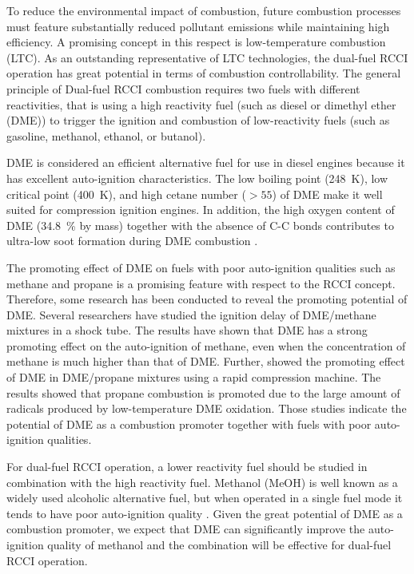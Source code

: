 \documentclass[12pt]{../ussci}
\begin{document}
To reduce the environmental impact of combustion, future combustion processes
must feature substantially reduced pollutant emissions while maintaining high
efficiency. A promising concept in this respect is low-temperature combustion
(LTC). As an outstanding representative of LTC technologies, the dual-fuel RCCI
operation has great potential in terms of combustion controllability. The
general principle of Dual-fuel RCCI combustion requires two fuels with different
reactivities, that is using a high reactivity fuel (such as diesel or dimethyl
ether (DME)) to trigger the ignition and combustion of low-reactivity fuels
(such as gasoline, methanol, ethanol, or butanol).

DME is considered an efficient alternative fuel for use in diesel engines
because it has excellent auto-ignition characteristics. The low boiling point
(\SI{248}{\K}), low critical point (\SI{400}{\K}), and high cetane number (\(>
55\)) of DME \autocite{Arcoumanis2008,Teng2001} make it well suited for
compression ignition engines. In addition, the high oxygen content of DME
(\SI{34.8}{\percent} by mass) together with the absence of C-C bonds
contributes to ultra-low soot formation during DME combustion
\autocite{Arcoumanis2008}.

The promoting effect of DME on fuels with poor auto-ignition qualities such as
methane and propane is a promising feature with respect to the RCCI concept.
Therefore, some research has been conducted to reveal the promoting potential of
DME. Several researchers \autocite{Burke2015a,Tang2012a,Chen2007a} have studied
the ignition delay of DME/methane mixtures in a shock tube. The results have
shown that DME has a strong promoting effect on the auto-ignition of methane,
even when the concentration of methane is much higher than that of DME. Further,
\textcite{Dames2016} showed the promoting effect of DME in DME/propane mixtures
using a rapid compression machine. The results showed that propane combustion is
promoted due to the large amount of radicals produced by low-temperature DME
oxidation. Those studies indicate the potential of DME as a combustion promoter
together with fuels with poor auto-ignition qualities.

For dual-fuel RCCI operation, a lower reactivity fuel should be studied in
combination with the high reactivity fuel. Methanol (MeOH) is well known as a
widely used alcoholic alternative fuel, but when operated in a single fuel mode
it tends to have poor auto-ignition quality \autocite{Siebers1987}. Given the
great potential of DME as a combustion promoter, we expect that DME can
significantly improve the auto-ignition quality of methanol and the combination
will be effective for dual-fuel RCCI operation.
\end{document}
